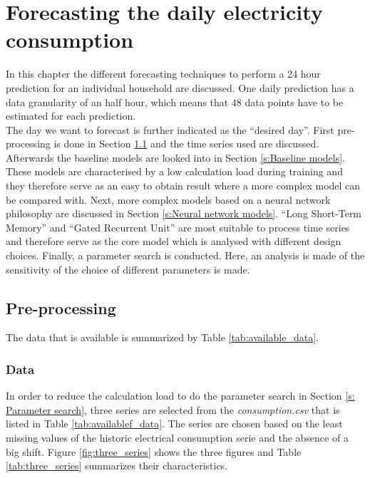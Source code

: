 \chapter{Forecasting the daily electricity consumption}
\label{cha:Forecasting the daily electricity consumption}
In this chapter the different forecasting techniques to perform a 24 hour prediction for an individual household are discussed. One daily prediction has a data granularity of an half hour, which means that $ 48 $ data points have to be estimated for each prediction. \\
 The day we want to forecast is further indicated as the ``desired day''. 
First pre-processing is done in Section \ref{s:Pre-processing} and the time series used are discussed. Afterwards the baseline models are looked into in Section \ref{s:Baseline models}. These models are characterised by a low calculation load during training and they therefore serve as an easy to obtain result where a more complex model can be compared with. Next, more complex models based on a neural network philosophy are discussed in Section \ref{s:Neural network models}. ``Long Short-Term Memory'' and ``Gated Recurrent Unit'' are most suitable to process time series and therefore serve as the core model which is analysed with different design choices. Finally, a parameter search is conducted. Here, an analysis is made of the sensitivity of the choice of different parameters is made.\\
 
\section{Pre-processing}\label{s:Pre-processing}
The data that is available is summarized by Table \ref{tab:available_data}. 

\subsection{Data}
In order to reduce the calculation load to do the parameter search in Section \ref{s: Parameter search}, three series are selected from the \textit{consumption.csv} that is listed in Table \ref{tab:availablef_data}. The series are chosen based on the least missing values of the historic electrical consumption serie and the absence of a big shift. Figure \ref{fig:three_series} shows the three figures and Table \ref{tab:three_series} summarizes their characteristics.\\

